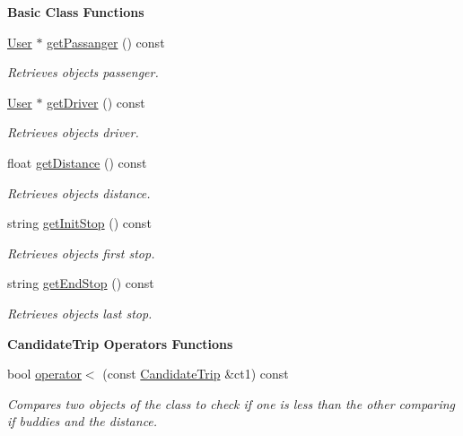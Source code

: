 \begin{Indent}\textbf{ Basic Class Functions}\par
\begin{DoxyCompactItemize}
\item 
\hyperlink{class_user}{User} $\ast$ \hyperlink{group___candidate_trip_gad205286835f81da2cd236be0b413cbcb}{get\+Passanger} () const
\begin{DoxyCompactList}\small\item\em Retrieves object\textquotesingle{}s passenger. \end{DoxyCompactList}\item 
\hyperlink{class_user}{User} $\ast$ \hyperlink{group___candidate_trip_ga0e97bd4bb576b9d891d69b3d4899387d}{get\+Driver} () const
\begin{DoxyCompactList}\small\item\em Retrieves object\textquotesingle{}s driver. \end{DoxyCompactList}\item 
float \hyperlink{group___candidate_trip_ga383245eac8a45bbea1ff7b6eb4b8c2bd}{get\+Distance} () const
\begin{DoxyCompactList}\small\item\em Retrieves object\textquotesingle{}s distance. \end{DoxyCompactList}\item 
string \hyperlink{group___candidate_trip_ga1fd998715e8a0c2ee6d28ab10c3fc3bf}{get\+Init\+Stop} () const
\begin{DoxyCompactList}\small\item\em Retrieves object\textquotesingle{}s first stop. \end{DoxyCompactList}\item 
string \hyperlink{group___candidate_trip_ga927733e7848429732fa14994cc837f2d}{get\+End\+Stop} () const
\begin{DoxyCompactList}\small\item\em Retrieves object\textquotesingle{}s last stop. \end{DoxyCompactList}\end{DoxyCompactItemize}
\end{Indent}
\begin{Indent}\textbf{ Candidate\+Trip Operators Functions}\par
\begin{DoxyCompactItemize}
\item 
bool \hyperlink{group___candidate_trip_gafa6782199d3dbf1f72509bd201516889}{operator$<$} (const \hyperlink{class_candidate_trip}{Candidate\+Trip} \&ct1) const
\begin{DoxyCompactList}\small\item\em Compares two objects of the class to check if one is less than the other comparing if buddies and the distance. \end{DoxyCompactList}\end{DoxyCompactItemize}
\end{Indent}

